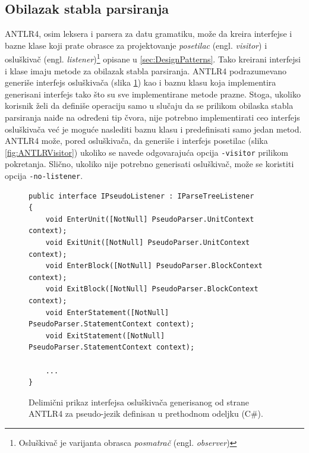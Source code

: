\subsection{Obilazak stabla parsiranja}
\label{subsec:ANTLRParserIntegration}

ANTLR4, osim leksera i parsera za datu gramatiku, može da kreira interfejse i bazne klase koji prate obrasce za projektovanje \emph{posetilac} (engl. \emph{visitor}) i osluškivač (engl. \emph{listener})\footnote{Osluškivač je varijanta obrasca \emph{posmatrač} (engl. \emph{observer})} opisane u \ref{sec:DesignPatterns}. Tako kreirani interfejsi i klase imaju metode za obilazak stabla parsiranja. ANTLR4 podrazumevano generiše interfejs osluškivača (slika \ref{fig:ANTLRListener}) kao i baznu klasu koja implementira generisani interfejs tako što su sve implementirane metode prazne. Stoga, ukoliko korisnik želi da definiše operaciju samo u slučaju da se prilikom obilaska stabla parsiranja naiđe na određeni tip čvora, nije potrebno implementirati ceo interfejs osluškivača već je moguće naslediti baznu klasu i predefinisati samo jedan metod. ANTLR4 može, pored osluškivača, da generiše i interfejs posetilac (slika \ref{fig:ANTLRVisitor}) ukoliko se navede odgovarajuća opcija \texttt{-visitor} prilikom pokretanja. Slično, ukoliko nije potrebno generisati osluškivač, može se koristiti opcija \texttt{-no-listener}.

\begin{figure}[h!]
\begin{lstlisting}
public interface IPseudoListener : IParseTreeListener
{
    void EnterUnit([NotNull] PseudoParser.UnitContext context);
    void ExitUnit([NotNull] PseudoParser.UnitContext context);
    void EnterBlock([NotNull] PseudoParser.BlockContext context);
    void ExitBlock([NotNull] PseudoParser.BlockContext context);
    void EnterStatement([NotNull] PseudoParser.StatementContext context);
    void ExitStatement([NotNull] PseudoParser.StatementContext context);
    
    ...
}
\end{lstlisting}
\caption{Delimični prikaz interfejsa osluškivača generisanog od strane ANTLR4 za pseudo-jezik definisan u prethodnom odeljku (C\#).}
\label{fig:ANTLRListener}
\end{figure}


